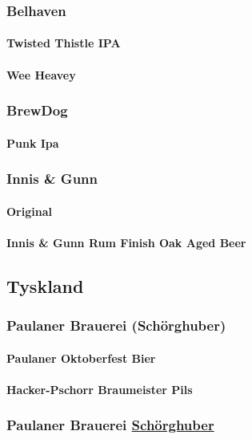 \documentclass[11pt]{article}
\begin{document}
\subsubsection{Belhaven}
\label{sec:org4a7832b}
\paragraph{Twisted Thistle IPA}
\label{sec:org6e53546}
\paragraph{Wee Heavey}
\label{sec:org28bc50d}
\subsubsection{BrewDog}
\label{sec:org757e934}
\paragraph{Punk Ipa}
\label{sec:org358cff1}
\subsubsection{Innis \& Gunn}
\label{sec:org31d9b85}
\paragraph{Original}
\label{sec:orgc1508b4}
\paragraph{Innis \& Gunn Rum Finish Oak Aged Beer}
\label{sec:orgc608961}
\subsection{Tyskland}
\label{sec:org3880ffd}
\subsubsection{Paulaner Brauerei (Schörghuber)}
\label{sec:orgdafb1df}
\paragraph{Paulaner Oktoberfest Bier}
\label{sec:org2924a0d}
\paragraph{Hacker-Pschorr Braumeister Pils}
\label{sec:org92feef9}
\subsubsection{Paulaner Brauerei \underline{Schörghuber}}
\label{sec:orga6d910d}
\end{document}
